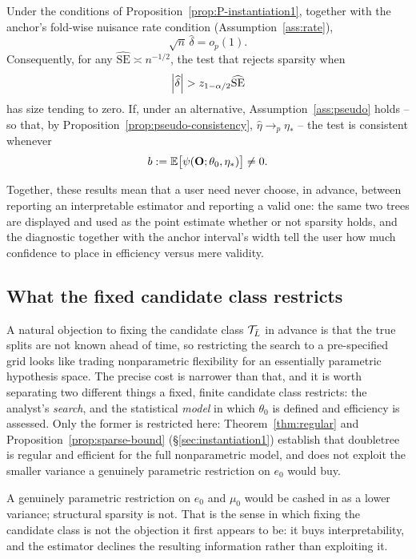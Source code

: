 \documentclass[12pt]{article}
\begin{document}
\begin{proposition}
\label{prop:spectest}
Under the conditions of Proposition~\ref{prop:P-instantiation1}, together with the anchor's
fold-wise nuisance rate condition (Assumption~\ref{ass:rate}),
\[
  \sqrt n\,\widehat\delta=o_p(1).
\]
Consequently, for any
$\widehat{\mathrm{SE}}\asymp n^{-1/2}$, the test that rejects sparsity when
\[
  \left|\widehat\delta\right|
  >
  z_{1-\alpha/2}\widehat{\mathrm{SE}}
\]
has size tending to zero. If, under an alternative, Assumption~\ref{ass:pseudo} holds -- so that, by
Proposition~\ref{prop:pseudo-consistency}, $\hat\eta\to_p\eta_*$ -- the test is
consistent whenever
\[
  b:=\mathbb{E}\bigl[\psi(\mathbf{O};\theta_0,\eta_*)\bigr]\ne0 .
\]
\end{proposition}

Together, these results mean that a user need never choose, in advance, between reporting an interpretable estimator and reporting a valid one: the same two trees are displayed and used as the point estimate whether or not sparsity holds, and the diagnostic together with the anchor interval's width tell the user how much confidence to place in efficiency versus mere validity.

\subsection{What the fixed candidate class restricts}
\label{sec:finite-discussion}

A natural objection to fixing the candidate class $\mathcal{T}_{\bar{L}}$ in advance is that the true splits are not known ahead of time, so restricting the search to a pre-specified grid looks like trading nonparametric flexibility for an essentially parametric hypothesis space. The precise cost is narrower than that, and it is worth separating two different things a fixed, finite candidate class restricts: the analyst's \emph{search}, and the statistical \emph{model} in which $\theta_0$ is defined and efficiency is assessed. Only the former is restricted here: Theorem~\ref{thm:regular} and Proposition~\ref{prop:sparse-bound} (\S\ref{sec:instantiation1}) establish that doubletree is regular and efficient for the full nonparametric model, and does not exploit the smaller variance a genuinely parametric restriction on $e_0$ would buy.

A genuinely parametric restriction on $e_0$ and $\mu_0$ would be cashed in as
a lower variance; structural sparsity is not. That is the sense in which
fixing the candidate class is not the objection it first appears to be: it
buys interpretability, and the estimator declines the resulting information
rather than exploiting it.
\end{document}
